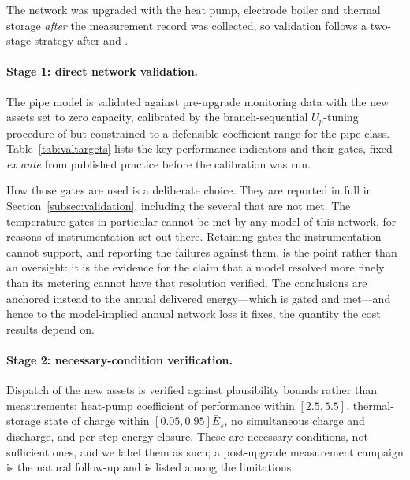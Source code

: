
The network was upgraded with the heat pump, electrode boiler and thermal storage
\emph{after} the measurement record was collected, so validation follows a two-stage
strategy after \citet{Kus2025} and \citet{Maldonado2024}.

\paragraph{Stage 1: direct network validation.}
The pipe model is validated against pre-upgrade monitoring data with the new assets set to
zero capacity, calibrated by the branch-sequential $U_p$-tuning procedure of
\citet{Maldonado2024} but constrained to a defensible coefficient range
for the pipe class. Table~\ref{tab:valtargets} lists the key performance indicators and
their gates, fixed \emph{ex ante} from published practice before the calibration was run.

How those gates are used is a deliberate choice. They are reported in full in Section~\ref{subsec:validation}, including the
several that are not met. The temperature gates in particular cannot be met by any model of
this network, for reasons of instrumentation set out there. Retaining gates the instrumentation cannot support, and
reporting the failures against them, is the point rather than an oversight: it is the
evidence for the claim that a model resolved more finely than its metering cannot have that
resolution verified. The conclusions are anchored instead to the annual delivered energy---which is gated and
met---and hence to the model-implied annual network loss it fixes, the quantity the cost
results depend on.

\paragraph{Stage 2: necessary-condition verification.}
Dispatch of the new assets is verified against plausibility bounds rather than
measurements: heat-pump coefficient of performance within $[2.5, 5.5]$, thermal-storage
state of charge within $[0.05, 0.95]\bar{E}_s$, no simultaneous charge and discharge, and
per-step energy closure. These are necessary conditions, not sufficient ones, and we label
them as such; a post-upgrade measurement campaign is the natural follow-up and is listed
among the limitations.

